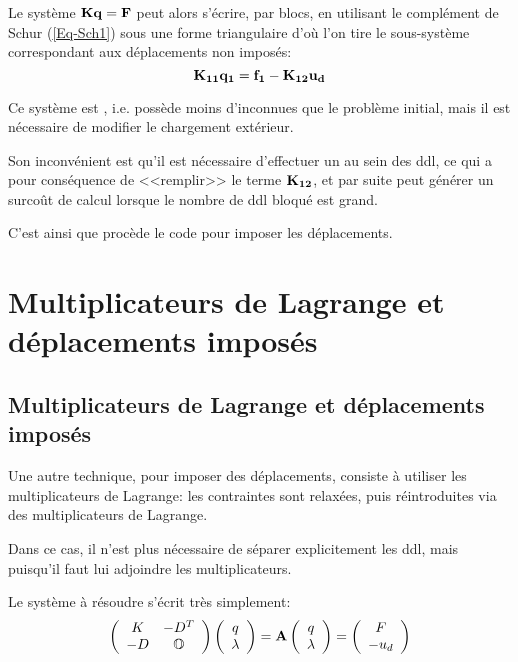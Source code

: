 \medskip
Le système $\mathbf{K}\mathbf{q}=\mathbf{F}$ peut alors s'écrire, par blocs, en utilisant le complément de Schur (\ref{Eq-Sch1}) sous une
forme triangulaire d'où l'on tire le sous-système correspondant aux déplacements non imposés:
\begin{equation}
\mathbf{K_{11}}\mathbf{q_1} = \mathbf{f_1} - \mathbf{K_{12}}\mathbf{u_d}
\end{equation}

\medskip
Ce système est , i.e. possède moins d'inconnues que le problème initial, mais il est nécessaire de
modifier le chargement extérieur.

Son inconvénient est qu'il est nécessaire d'effectuer un  au sein des ddl, ce qui a pour conséquence de 
<<remplir>> le terme $\mathbf{K_{12}}$, et par suite peut générer un surcoût de calcul lorsque le nombre de ddl bloqué
est grand.

C'est ainsi que procède le code \abaqus pour imposer les déplacements.



\medskip
\ifVersionAvecExemplesSepares
   \section{Multiplicateurs de Lagrange et déplacements imposés}\label{Sec-cast}
\else
   \subsection{Multiplicateurs de Lagrange et déplacements imposés}\label{Sec-cast}
\fi

Une autre technique, pour imposer des déplacements, consiste à utiliser les multiplicateurs de Lagrange:
les contraintes sont relaxées, puis réintroduites via des multiplicateurs de Lagrange.

Dans ce cas, il n'est plus nécessaire de séparer explicitement les ddl, mais  puisqu'il faut lui adjoindre les multiplicateurs.

Le système à résoudre s'écrit très simplement:
\begin{equation}\label{Eq-Lag1}
\left( \begin{array}{cc} K & -D^T\\ -D & \mathbb{O}{} \end{array}\right)
\left( \begin{array}{c} q\\ \lambda \end{array}\right) =
\mathbf{A}
\left( \begin{array}{c} q\\ \lambda \end{array}\right) =
\left( \begin{array}{c} F\\ -u_d \end{array}\right) 
\end{equation}

